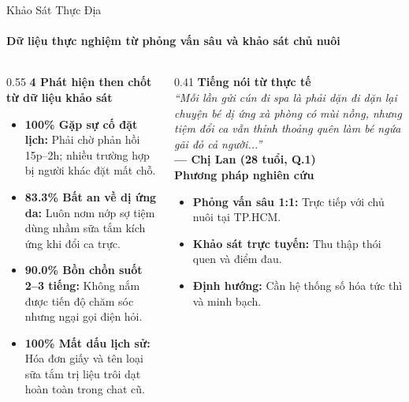 \begin{frame}{Khảo Sát Thực Địa}
  \framesubtitle{\color{white!90}\textbf{Dữ liệu thực nghiệm từ phỏng vấn sâu và khảo sát chủ nuôi}}

  \begin{columns}[T]
    \begin{column}{0.55\textwidth}
      {\color{PetcarePrimary}\large \textbf{4 Phát hiện then chốt từ dữ liệu khảo sát}}\\[2mm]
      \small
      \begin{itemize}
        \setlength\itemsep{2.8mm}
        \item \textbf{100\% Gặp sự cố đặt lịch:} Phải chờ phản hồi 15p--2h; nhiều trường hợp bị người khác đặt mất chỗ.
        \item \textbf{83.3\% Bất an về dị ứng da:} Luôn nơm nớp sợ tiệm dùng nhầm sữa tắm kích ứng khi đổi ca trực.
        \item \textbf{90.0\% Bồn chồn suốt 2--3 tiếng:} Không nắm được tiến độ chăm sóc nhưng ngại gọi điện hỏi.
        \item \textbf{100\% Mất dấu lịch sử:} Hóa đơn giấy và tên loại sữa tắm trị liệu trôi dạt hoàn toàn trong chat cũ.
      \end{itemize}
    \end{column}

    \begin{column}{0.41\textwidth}
      {\color{PetcarePrimary}\large \textbf{Tiếng nói từ thực tế}}\\[2mm]
      \small
      \textit{``Mỗi lần gửi cún đi spa là phải dặn đi dặn lại chuyện bé dị ứng xà phòng có mùi nồng, nhưng tiệm đổi ca vẫn thỉnh thoảng quên làm bé ngứa gãi đỏ cả người...''}\\[1.5mm]
      \hfill \textbf{--- Chị Lan (28 tuổi, Q.1)}\\[4mm]

      {\color{PetcarePrimary}\large \textbf{Phương pháp nghiên cứu}}\\[2mm]
      \small
      \begin{itemize}
        \setlength\itemsep{2mm}
        \item \textbf{Phỏng vấn sâu 1:1:} Trực tiếp với chủ nuôi tại TP.HCM.
        \item \textbf{Khảo sát trực tuyến:} Thu thập thói quen và điểm đau.
        \item \textbf{Định hướng:} Cần hệ thống số hóa tức thì và minh bạch.
      \end{itemize}
    \end{column}
  \end{columns}
\end{frame}
